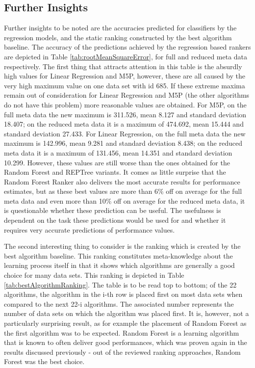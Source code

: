 

\subsection{Further Insights}

Further insights to be noted are the accuracies predicted for classifiers by the regression models, and the static ranking constructed by the best algorithm baseline. The accuracy of the predictions achieved by the regression based rankers are depicted in Table \ref{tab:rootMeanSquareError}, for full and reduced meta data respectively. The first thing that attracts attention in this table is the absurdly high values for Linear Regression and M5P, however, these are all caused by the very high maximum value on one data set with id 685. If these extreme maxima remain out of consideration for Linear Regression and M5P (the other algorithms do not have this problem) more reasonable values are obtained. For M5P, on the full meta data the new maximum is 311.526, mean 8.127 and standard deviation 18.407; on the reduced meta data it is a maximum of 474.692, mean 15.444 and standard deviation 27.433. For Linear Regression, on the full meta data the new maximum is 142.996, mean 9.281 and standard deviation 8.438; on the reduced meta data it is a maximum of 131.456, mean 14.351 and standard deviation 10.299. However, these values are still worse than the ones obtained for the Random Forest and REPTree variants. It comes as little surprise that the Random Forest Ranker also delivers the most accurate results for performance estimates, but as these best values are more than 6\% off on average for the full meta data and even more than 10\% off on average for the reduced meta data, it is questionable whether these prediction can be useful. The usefulness is dependent on the task these predictions would be used for and whether it requires very accurate predictions of performance values.



The second interesting thing to consider is the ranking which is created by the best algorithm baseline. This ranking constitutes meta-knowledge about the learning process itself in that it shows which algorithms are generally a good choice for many data sets. This ranking is depicted in Table \ref{tab:bestAlgorithmRanking}. The table is to be read top to bottom; of the 22 algorithms, the algorithm in the i-th row is placed first on most data sets when compared to the next 22-i algorithms. The associated number represents the number of data sets on which the algorithm was placed first. It is, however, not a particularly surprising result, as for example the placement of Random Forest as the first algorithm was to be expected. Random Forest is a learning algorithm that is known to often deliver good performances, which was proven again in the results discussed previously - out of the reviewed ranking approaches, Random Forest was the best choice.

